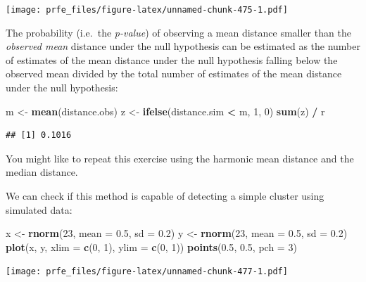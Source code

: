 \documentclass[12pt,a4paper]{book}
\newenvironment{Shaded}{\begin{snugshade}}{\end{snugshade}}
\newcommand{\KeywordTok}[1]{\textcolor[rgb]{0.13,0.29,0.53}{\textbf{#1}}}
\newcommand{\DataTypeTok}[1]{\textcolor[rgb]{0.13,0.29,0.53}{#1}}
\newcommand{\DecValTok}[1]{\textcolor[rgb]{0.00,0.00,0.81}{#1}}
\newcommand{\FloatTok}[1]{\textcolor[rgb]{0.00,0.00,0.81}{#1}}
\newcommand{\StringTok}[1]{\textcolor[rgb]{0.31,0.60,0.02}{#1}}
\newcommand{\OperatorTok}[1]{\textcolor[rgb]{0.81,0.36,0.00}{\textbf{#1}}}
\newcommand{\NormalTok}[1]{#1}
\theoremstyle{definition}
\theoremstyle{definition}
\theoremstyle{definition}
\theoremstyle{remark}
\begin{document}
\texttt{[image: prfe\_files/figure-latex/unnamed-chunk-475-1.pdf]}

The probability (i.e.~the \emph{p-value}) of observing a mean distance
smaller than the \emph{observed mean} distance under the null hypothesis
can be estimated as the number of estimates of the mean distance under
the null hypothesis falling below the observed mean divided by the total
number of estimates of the mean distance under the null hypothesis:

\begin{Shaded}
\begin{Highlighting}[]
\NormalTok{m <-}\StringTok{ }\KeywordTok{mean}\NormalTok{(distance.obs)}
\NormalTok{z <-}\StringTok{ }\KeywordTok{ifelse}\NormalTok{(distance.sim }\OperatorTok{<}\StringTok{ }\NormalTok{m, }\DecValTok{1}\NormalTok{, }\DecValTok{0}\NormalTok{)}
\KeywordTok{sum}\NormalTok{(z) }\OperatorTok{/}\StringTok{ }\NormalTok{r}
\end{Highlighting}
\end{Shaded}

\begin{verbatim}
## [1] 0.1016
\end{verbatim}

You might like to repeat this exercise using the harmonic mean distance
and the median distance.

We can check if this method is capable of detecting a simple cluster
using simulated data:

\begin{Shaded}
\begin{Highlighting}[]
\NormalTok{x <-}\StringTok{ }\KeywordTok{rnorm}\NormalTok{(}\DecValTok{23}\NormalTok{, }\DataTypeTok{mean =} \FloatTok{0.5}\NormalTok{, }\DataTypeTok{sd =} \FloatTok{0.2}\NormalTok{)}
\NormalTok{y <-}\StringTok{ }\KeywordTok{rnorm}\NormalTok{(}\DecValTok{23}\NormalTok{, }\DataTypeTok{mean =} \FloatTok{0.5}\NormalTok{, }\DataTypeTok{sd =} \FloatTok{0.2}\NormalTok{)}
\KeywordTok{plot}\NormalTok{(x, y, }\DataTypeTok{xlim =} \KeywordTok{c}\NormalTok{(}\DecValTok{0}\NormalTok{, }\DecValTok{1}\NormalTok{), }\DataTypeTok{ylim =} \KeywordTok{c}\NormalTok{(}\DecValTok{0}\NormalTok{, }\DecValTok{1}\NormalTok{))}
\KeywordTok{points}\NormalTok{(}\FloatTok{0.5}\NormalTok{, }\FloatTok{0.5}\NormalTok{, }\DataTypeTok{pch =} \DecValTok{3}\NormalTok{)}
\end{Highlighting}
\end{Shaded}

\texttt{[image: prfe\_files/figure-latex/unnamed-chunk-477-1.pdf]}
\end{document}
